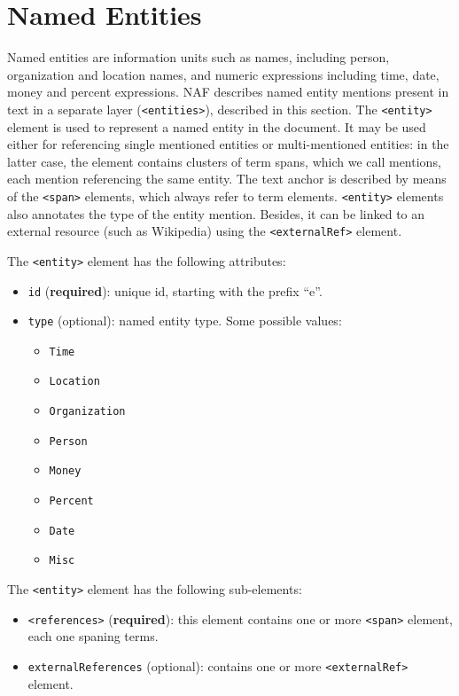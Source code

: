 
\section{Named Entities}
\label{sec:named-entities}

Named entities are information units such as names, including person,
organization and location names, and numeric expressions including time,
date, money and percent expressions. NAF describes named entity mentions
present in text in a separate layer (\texttt{<entities>}), described in this
section. The \texttt{<entity>} element is used to represent a named entity
in the document. It may be used either for referencing single mentioned
entities or multi-mentioned entities: in the latter case, the element
contains clusters of term spans, which we call mentions, each mention
referencing the same entity. The text anchor is described by means of the
\texttt{<span>} elements, which always refer to term
elements. \texttt{<entity>} elements also annotates the type of the entity
mention. Besides, it can be linked to an external resource (such as
Wikipedia) using the \texttt{<externalRef>} element.

The \texttt{<entity>} element has the following attributes:
\begin{itemize}
\item \texttt{id} (\textbf{required}): unique id, starting with the prefix ``e''.
\item \texttt{type} (optional): named entity type. Some possible values:
  \begin{itemize}
  \item \texttt{Time}
  \item \texttt{Location}
  \item \texttt{Organization}
  \item \texttt{Person}
  \item \texttt{Money}
  \item \texttt{Percent}
  \item \texttt{Date}
  \item \texttt{Misc}
\end{itemize}
\end{itemize}

The \texttt{<entity>} element has the following sub-elements:
\begin{itemize}
\item \texttt{<references>} (\textbf{required}): this element contains one or
  more \texttt{<span>} element, each one spaning terms.
\item \texttt{externalReferences} (optional): contains one or more
  \texttt{<externalRef>} element.
\end{itemize}

